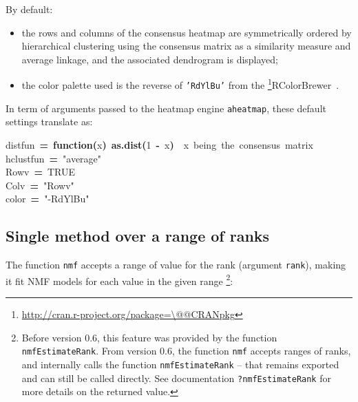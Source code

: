 \documentclass[a4paper]{article}\usepackage{graphicx, color}
\makeatletter
\newcommand{\hlnumber}[1]{\textcolor[rgb]{0,0,0}{#1}}%
\newcommand{\hlfunctioncall}[1]{\textcolor[rgb]{0.501960784313725,0,0.329411764705882}{\textbf{#1}}}%
\newcommand{\hlstring}[1]{\textcolor[rgb]{0.6,0.6,1}{#1}}%
\newcommand{\hlkeyword}[1]{\textcolor[rgb]{0,0,0}{\textbf{#1}}}%
\newcommand{\hlcomment}[1]{\textcolor[rgb]{0.180392156862745,0.6,0.341176470588235}{#1}}%
\newcommand{\hlformalargs}[1]{\textcolor[rgb]{0.690196078431373,0.250980392156863,0.0196078431372549}{#1}}%
\newcommand{\hlassignement}[1]{\textcolor[rgb]{0,0,0}{\textbf{#1}}}%
\newcommand{\hlsymbol}[1]{\textcolor[rgb]{0,0,0}{#1}}%
\newcommand{\hlstd}[1]{\textcolor[rgb]{0,0,0}{#1}}%
\newenvironment{kframe}{%
 \def\FrameCommand##1{\hskip\@totalleftmargin \hskip-\fboxsep
 \colorbox{shadecolor}{##1}\hskip-\fboxsep
     \hskip-\linewidth \hskip-\@totalleftmargin \hskip\columnwidth}%
 \MakeFramed {\advance\hsize-\width
   \@totalleftmargin\z@ \linewidth\hsize
   \@setminipage}}%
 {\par\unskip\endMakeFramed}
\newenvironment{knitrout}{}{} %
\let\code=\texttt
\newcommand{\pkgname}[1]{\textit{#1}\xspace}
\newcommand{\CRANurl}[1]{\url{http://cran.r-project.org/package=#1}}
\def\CRANpkg{\@ifstar\@CRANpkg\@@CRANpkg}
\def\@CRANpkg#1{\href{http://cran.r-project.org/package=#1}{\pkgname{#1}}\footnote{\CRANurl{#1}}}
\def\@@CRANpkg#1{\href{http://cran.r-project.org/package=#1}{\pkgname{#1}} package\footnote{\CRANurl{#1}}}
\newcommand{\citeCRANpkg}[1]{\CRANpkg{#1}~\cite{#1}}
\makeatother
\begin{document}
By default:
\begin{itemize}
\item the rows and columns of the consensus heatmap are symmetrically 
ordered by hierarchical clustering using the consensus matrix as a similarity 
measure and average linkage, and the associated dendrogram is displayed;
\item the color palette used is the reverse of \code{'RdYlBu'} from the \citeCRANpkg{RColorBrewer}.
\end{itemize}

In term of arguments passed to the heatmap engine \code{aheatmap}, these default 
settings translate as:

\begin{knitrout}
\color{fgcolor}\begin{kframe}
\begin{flushleft}
\ttfamily\noindent
\hlsymbol{distfun}{\ }\hlassignement{=}{\ }\hlkeyword{function}\hlkeyword{(}\hlformalargs{x}\hlkeyword{)}{\ }\hlfunctioncall{as.dist}\hlkeyword{(}\hlnumber{1}{\ }\hlkeyword{-}{\ }\hlsymbol{x}\hlkeyword{)}{\ }{\ }\hlcomment{\usebox{\hlnormalsizeboxhash}{\ }x{\ }being{\ }the{\ }consensus{\ }matrix}\hspace*{\fill}\\
\hlstd{}\hlsymbol{hclustfun}{\ }\hlassignement{=}{\ }\hlstring{"{}average"{}}\hspace*{\fill}\\
\hlstd{}\hlsymbol{Rowv}{\ }\hlassignement{=}{\ }\hlnumber{TRUE}\hspace*{\fill}\\
\hlstd{}\hlsymbol{Colv}{\ }\hlassignement{=}{\ }\hlstring{"{}Rowv"{}}\hspace*{\fill}\\
\hlstd{}\hlsymbol{color}{\ }\hlassignement{=}{\ }\hlstring{"{}-RdYlBu"{}}\mbox{}
\normalfont
\end{flushleft}
\end{kframe}
\end{knitrout}


\subsection{Single method over a range of ranks}

The function \code{nmf} accepts a range of value for the rank (argument \code{rank}), 
making it fit NMF models for each value in the given range
\footnote{Before version 0.6, this feature was provided by the function \code{nmfEstimateRank}.
From version 0.6, the function \code{nmf} accepts ranges of ranks, and internally 
calls the function \code{nmfEstimateRank} -- that remains exported and can still 
be called directly. 
See documentation \code{?nmfEstimateRank} for more details on the returned value.}:
\end{document}
